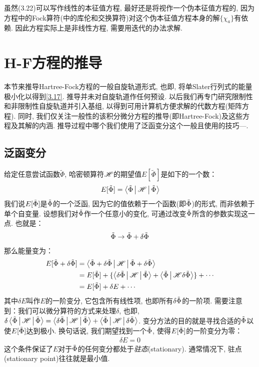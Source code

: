 虽然(3.22)可以写作线性的本征值方程, 
最好还是将视作一个伪本征值方程的, 
因为方程中的Fock算符(中的库伦和交换算符)对这个伪本征值方程本身的解$\{\chi_a \}$有依赖. 
因此\hft 方程实际上是非线性方程, 
需要用迭代的办法求解.

\section{H-F方程的推导}
本节来推导Hartree-Fock方程的一般自旋轨道形式, 
也即, 
将单Slater行列式的能量极小化以得到\autoref{3.17}. 
推导并未对自旋轨道作任何预设. 
以后我们再专门研究限制性和非限制性自旋轨道并引入基组, 
以得到可用计算机方便求解的代数方程(矩阵方程). 
同时, 
我们仅关注一般性的该积分微分方程的推导(即Hartree-Fock)及这些方程及其解的内涵. 
推导过程中哪个我们使用了泛函变分这个一般且使用的技巧—. 

\subsection{泛函变分}
给定任意尝试函数$\tilde{\Phi}$, 
哈密顿算符$\mathscr{H}$的期望值$E[\tilde{\Phi}]$是如下的一个数：
\begin{align}
	E[\tilde{\Phi}] = \Braket{\tilde{\Phi}|\mathscr{H}|\tilde{\Phi}}
\end{align}
我们说$E[\tilde{\Phi}]$是$\tilde{\Phi}$的一个泛函, 
因为它的值依赖于一个函数(即$\tilde{\Phi}$)的形式, 
而非依赖于单个自变量. 
设想我们对$\tilde{\Phi}$作一个任意小的变化, 
可通过改变$\tilde{\Phi}$所含的参数实现这一点. 
也就是：
\begin{align}
	\tilde{\Phi} \to \tilde{\Phi} + \delta\tilde{\Phi}
\end{align} 
那么能量变为：
\begin{align}
	E[\tilde{\Phi}+\delta\tilde{\Phi}] & = \Braket{\tilde{\Phi}+\delta\tilde{\Phi}|\mathscr{H}|\tilde{\Phi}+\delta\tilde{\Phi}} \notag\\
	& = E[\tilde{\Phi}] + \{ \Braket{\delta\tilde{\Phi}|\mathscr{H}|\tilde{\Phi}} + \Braket{\tilde{\Phi}|\mathscr{H}\delta\tilde{\Phi}} \} + \cdots \notag\\
	& = E[\tilde{\Phi}] + \delta E + \cdots
\end{align}
其中$\delta E$叫作$E$的一阶变分, 
它包含所有线性项, 
也即所有$\delta\tilde{\Phi}$的一阶项. 
需要注意到：我们可以微分算符的方式来处理$\delta$, 
也即, 
$\delta\Braket{\tilde{\Phi}|\mathscr{H}|\tilde{\Phi}} = \Braket{\delta\tilde{\Phi}|\mathscr{H}|\tilde{\Phi}} + \Braket{\tilde{\Phi}|\mathscr{H}|\delta\tilde{\Phi}}$. 
变分方法的目的就是寻找合适的$\tilde{\Phi}$以使$E[\tilde{\Phi}]$达到极小. 
换句话说, 
我们期望找到一个$\tilde{\Phi}$, 
使得$E[\tilde{\Phi}]$的一阶变分为零：
\begin{align}
	\delta E = 0
\end{align}
这个条件保证了$E$对于$\tilde{\Phi}$的任何变分都处于\emph{驻态}(stationary). 
通常情况下, 
驻点(stationary point)往往就是最小值.


